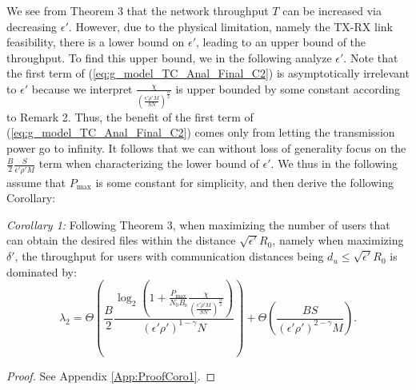 \documentclass[journal,draftclsnofoot,onecolumn,12pt,twoside]{IEEEtran}
\begin{document}
We see from Theorem 3 that the network throughput $T$ can be increased via decreasing $\epsilon'$. However, due to the physical limitation, namely the TX-RX link feasibility, there is a lower bound on $\epsilon'$, leading to an upper bound of the throughput. To find this upper bound, we in the following analyze $\epsilon'$. Note that the first term of (\ref{eq:g_model_TC_Anal_Final_C2}) is asymptotically irrelevant to $\epsilon'$ because we interpret $\frac{\chi}{\left(\frac{\epsilon'\rho'M}{SN}\right)^\frac{\alpha}{2}}$ is upper bounded by some constant according to Remark 2. Thus, the benefit of the first term of (\ref{eq:g_model_TC_Anal_Final_C2}) comes only from letting the transmission power go to infinity. It follows that we can without loss of generality focus on the $\frac{B}{2}\frac{S}{\epsilon'\rho'M}$ term when characterizing the lower bound of $\epsilon'$. We thus in the following assume that $P_{\text{max}}$ is some constant for simplicity, and then derive the following Corollary:

{\em Corollary 1:} Following Theorem 3, when maximizing the number of users that can obtain the desired files within the distance $\sqrt{\epsilon'}R_0$, namely when maximizing $\delta'$, the throughput for users with communication distances being $d_u\leq\sqrt{\epsilon'}R_0$ is dominated by:
\begin{equation}
\lambda_2=\Theta\left(\frac{B}{2}\frac{\log_2\left(1+\frac{P_{\text{max}}}{N_0B_{\text{s}}}\frac{\chi}{\left(\frac{\epsilon'\rho'M}{SN}\right)^\frac{\alpha}{2}}\right)}{(\epsilon'\rho')^{1-\gamma}N}\right)+\Theta\left(\frac{BS}{(\epsilon'\rho')^{2-\gamma}M}\right).
\end{equation}
\begin{proof}
See Appendix \ref{App:ProofCoro1}.
\end{proof}
\end{document}
